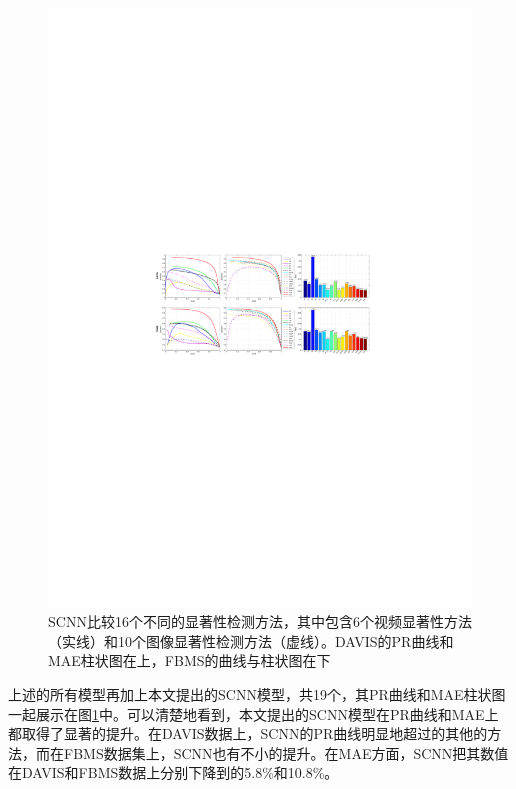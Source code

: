 \begin{figure}[tbp]
\includegraphics[width=15cm]{figures/methos_compare_new2}
\caption{SCNN比较16个不同的显著性检测方法，其中包含6个视频显著性方法（实线）和10个图像显著性检测方法（虚线）。DAVIS的PR曲线和MAE柱状图在上，FBMS的曲线与柱状图在下}
\label{figure4}
\end{figure}

上述的所有模型再加上本文提出的SCNN模型，共19个，其PR曲线和MAE柱状图一起展示在图\ref{figure4}中。可以清楚地看到，本文提出的SCNN模型在PR曲线和MAE上都取得了显著的提升。在DAVIS数据上，SCNN的PR曲线明显地超过的其他的方法，而在FBMS数据集上，SCNN也有不小的提升。在MAE方面，SCNN把其数值在DAVIS和FBMS数据上分别下降到的5.8\%和10.8\%。

